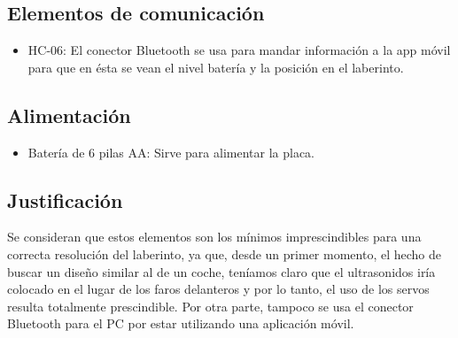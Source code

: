 \subsection{Elementos de comunicación}
\begin{itemize}
  \item HC-06: El conector Bluetooth se usa para mandar información a la app móvil para que en ésta se vean el nivel batería y la posición en el laberinto.
\end{itemize}

\subsection{Alimentación}
\begin{itemize}
  \item Batería de 6 pilas AA: Sirve para alimentar la placa.
\end{itemize}

\subsection{Justificación}
Se consideran que estos elementos son los mínimos imprescindibles para una correcta resolución del laberinto, ya que, desde un primer momento, el hecho de buscar un diseño similar al de un coche, teníamos claro que el ultrasonidos iría colocado en el lugar de los faros delanteros y por lo tanto, el uso de los servos resulta totalmente prescindible. Por otra parte, tampoco se usa el conector Bluetooth para el PC por estar utilizando una aplicación móvil.

